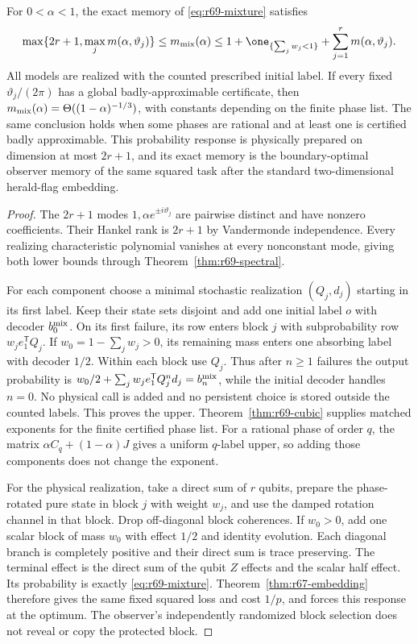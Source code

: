 \begin{theorem}\label{thm:r69-finite-mixture}
For $0<\alpha<1$, the exact memory of \eqref{eq:r69-mixture} satisfies
\begin{equation}\label{eq:r69-mixture-bounds}
 \max\{2r+1,\max_j m(\alpha,\vartheta_j)\}
 \le m_{\rm mix}(\alpha)
 \le 1+\one_{\{\sum_jw_j<1\}}+\sum_{j=1}^r m(\alpha,\vartheta_j).
\end{equation}
All models are realized with the counted prescribed initial label. If every fixed $\vartheta_j/(2\pi)$ has a global badly-approximable certificate, then
$m_{\rm mix}(\alpha)=\Theta((1-\alpha)^{-1/3})$, with constants depending on the finite phase list. The same conclusion holds when some phases are rational and at least one is certified badly approximable. This probability response is physically prepared on dimension at most $2r+1$, and its exact memory is the boundary-optimal observer memory of the same squared task after the standard two-dimensional herald-flag embedding.
\end{theorem}
\begin{proof}
The $2r+1$ modes $1,\alpha e^{\pm i\vartheta_j}$ are pairwise distinct and have nonzero coefficients. Their Hankel rank is $2r+1$ by Vandermonde independence. Every realizing characteristic polynomial vanishes at every nonconstant mode, giving both lower bounds through Theorem~\ref{thm:r69-spectral}.

For each component choose a minimal stochastic realization $(Q_j,d_j)$ starting in its first label. Keep their state sets disjoint and add one initial label $o$ with decoder $b_0^{\rm mix}$. On its first failure, its row enters block $j$ with subprobability row $w_je_1^{\mathsf T}Q_j$. If $w_0=1-\sum_jw_j>0$, its remaining mass enters one absorbing label with decoder $1/2$. Within each block use $Q_j$. Thus after $n\ge1$ failures the output probability is
$w_0/2+\sum_jw_je_1^{\mathsf T}Q_j^nd_j=b_n^{\rm mix}$, while the initial decoder handles $n=0$. No physical call is added and no persistent choice is stored outside the counted labels. This proves the upper. Theorem~\ref{thm:r69-cubic} supplies matched exponents for the finite certified phase list. For a rational phase of order $q$, the matrix $\alpha C_q+(1-\alpha)J$ gives a uniform $q$-label upper, so adding those components does not change the exponent.

For the physical realization, take a direct sum of $r$ qubits, prepare the phase-rotated pure state in block $j$ with weight $w_j$, and use the damped rotation channel in that block. Drop off-diagonal block coherences. If $w_0>0$, add one scalar block of mass $w_0$ with effect $1/2$ and identity evolution. Each diagonal branch is completely positive and their direct sum is trace preserving. The terminal effect is the direct sum of the qubit $Z$ effects and the scalar half effect. Its probability is exactly \eqref{eq:r69-mixture}. Theorem~\ref{thm:r67-embedding} therefore gives the same fixed squared loss and cost $1/p$, and forces this response at the optimum. The observer's independently randomized block selection does not reveal or copy the protected block.
\end{proof}

